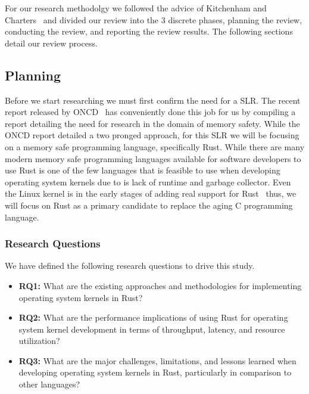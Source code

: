 \documentclass[sigconf]{acmart}
\begin{document}
For our research methodolgy we followed the advice of Kitchenham and Charters~\cite{Stuart2007-cc} and divided our review into the 3 discrete phases, planning the review, conducting the review, and reporting the review results. The following sections detail our review process.

\subsection{Planning}

Before we start researching we must first confirm the need for a SLR. The recent report released by ONCD~\cite{United_States_Gov2024-pp} has conveniently done this job for us by compiling a report detailing the need for research in the domain of memory safety. While the ONCD report detailed a two pronged approach, for this SLR we will be focusing on a memory safe programming language, specifically Rust. While there are many modern memory safe programming languages available for software developers to use Rust is one of the few languages that is feasible to use when developing operating system kernels due to is lack of runtime and garbage collector. Even the Linux kernel is in the early stages of adding real support for Rust~\cite{The_kernel_development_community_undated-iw} thus, we will focus on Rust as a primary candidate to replace the aging C programming language.

\subsubsection{Research Questions}
\label{sec:researchQuestions}

We have defined the following research questions to drive this study.

\begin{itemize}
    \item \textbf{RQ1:} What are the existing approaches and methodologies for implementing
      operating system kernels in Rust?
    \item \textbf{RQ2:} What are the performance implications of using Rust for operating system
      kernel development in terms of throughput, latency, and resource utilization?
    \item \textbf{RQ3:} What are the major challenges, limitations, and lessons learned when
      developing operating system kernels in Rust, particularly in comparison to other languages?
\end{itemize}
\end{document}

